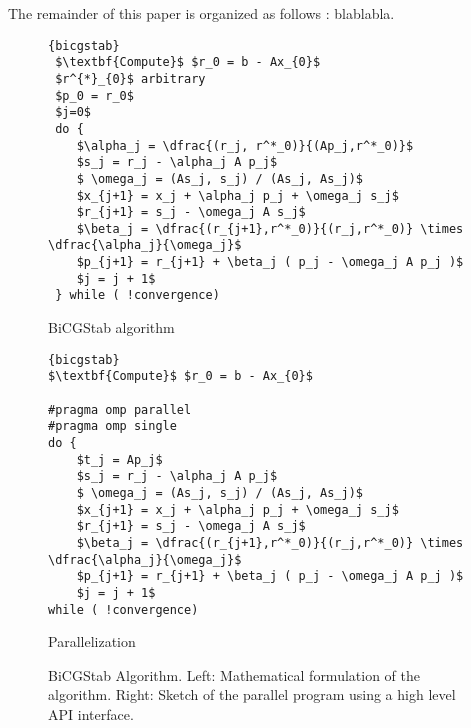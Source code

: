 \documentclass{Styles/llncs}
\begin{document}

The remainder of this paper is organized as follows : blablabla.

\begin{figure}[t]
\begin{minipage}[c]{0.4\linewidth}
\begin{lstlisting}[frame=none,style=smaller,showlines=true,mathescape=true]{bicgstab}
 $\textbf{Compute}$ $r_0 = b - Ax_{0}$
 $r^{*}_{0}$ arbitrary
 $p_0 = r_0$
 $j=0$
 do {
	$\alpha_j = \dfrac{(r_j, r^*_0)}{(Ap_j,r^*_0)}$
	$s_j = r_j - \alpha_j A p_j$
	$ \omega_j = (As_j, s_j) / (As_j, As_j)$
	$x_{j+1} = x_j + \alpha_j p_j + \omega_j s_j$
	$r_{j+1} = s_j - \omega_j A s_j$
	$\beta_j = \dfrac{(r_{j+1},r^*_0)}{(r_j,r^*_0)} \times \dfrac{\alpha_j}{\omega_j}$
	$p_{j+1} = r_{j+1} + \beta_j ( p_j - \omega_j A p_j )$
	$j = j + 1$
 } while ( !convergence)
\end{lstlisting}
\centerline{BiCGStab algorithm}
\end{minipage}\hfill
\begin{minipage}[c]{0.5\linewidth}
\begin{lstlisting}[frame=none,style=smaller,showlines=true,mathescape=true,firstnumber=1]{bicgstab}
$\textbf{Compute}$ $r_0 = b - Ax_{0}$

#pragma omp parallel
#pragma omp single
do {
	$t_j = Ap_j$
	$s_j = r_j - \alpha_j A p_j$
	$ \omega_j = (As_j, s_j) / (As_j, As_j)$
	$x_{j+1} = x_j + \alpha_j p_j + \omega_j s_j$
	$r_{j+1} = s_j - \omega_j A s_j$
	$\beta_j = \dfrac{(r_{j+1},r^*_0)}{(r_j,r^*_0)} \times \dfrac{\alpha_j}{\omega_j}$
	$p_{j+1} = r_{j+1} + \beta_j ( p_j - \omega_j A p_j )$
	$j = j + 1$
while ( !convergence)
\end{lstlisting}
\centerline{Parallelization}
\end{minipage}
\caption{BiCGStab Algorithm. Left: Mathematical formulation of the algorithm. Right: Sketch of the parallel program using a high level API interface.} \label{lst:bicgstab}
\end{figure}
\end{document}
